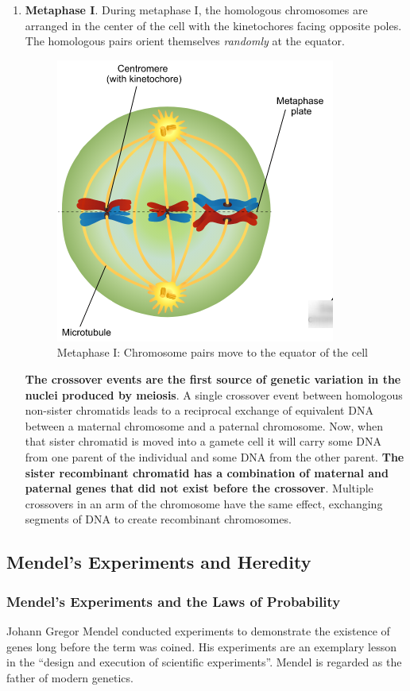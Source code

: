 \begin{enumerate}
    \item \textbf{Metaphase I}. During metaphase I, the homologous chromosomes are arranged in the center of the cell with the kinetochores facing opposite poles. The homologous pairs orient themselves \emph{randomly} at the equator. 
\begin{figure}[h!]
    \centering
    \includegraphics[scale=0.4]{metaphase-I.png}
    \caption{Metaphase I: Chromosome pairs move to the equator of the cell}
    \label{fig: metaphase-I}
\end{figure}
        \textbf{The crossover events are the first source of genetic variation in the nuclei produced by meiosis}. A single crossover event between homologous non-sister chromatids leads to a reciprocal exchange of equivalent DNA between a maternal chromosome and a paternal chromosome. Now, when that sister chromatid is moved into a gamete cell it will carry some DNA from one parent of the individual and some DNA from the other parent. \textbf{The sister recombinant chromatid has a combination of maternal and paternal genes that did not exist before the crossover}. Multiple crossovers in an arm of the chromosome have the same effect, exchanging segments of DNA to create recombinant chromosomes.
\end{enumerate}


\newpage
\subsection{Mendel's Experiments and Heredity}

\subsubsection{Mendel's Experiments and the Laws of Probability}
Johann Gregor Mendel conducted experiments to demonstrate the existence of genes long before the term was coined. His experiments are an exemplary lesson in the ``design and execution of scientific experiments''. Mendel is regarded as the father of modern genetics.


